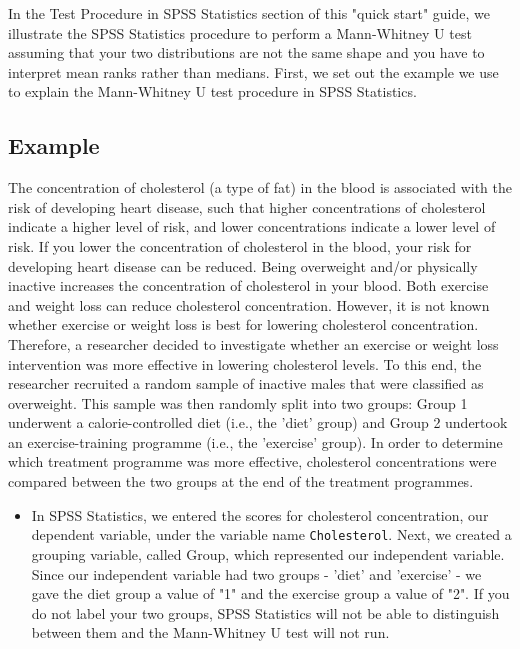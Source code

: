 \documentclass[]{article}
\begin{document}
In the Test Procedure in SPSS Statistics section of this "quick start" guide, we illustrate the SPSS Statistics procedure to perform a Mann-Whitney U test assuming that your two distributions are not the same shape and you have to interpret mean ranks rather than medians. First, we set out the example we use to explain the Mann-Whitney U test procedure in SPSS Statistics.

\subsection{Example}
The concentration of cholesterol (a type of fat) in the blood is associated with the risk of developing heart disease, such that higher concentrations of cholesterol indicate a higher level of risk, and lower concentrations indicate a lower level of risk. If you lower the concentration of cholesterol in the blood, your risk for developing heart disease can be reduced. Being overweight and/or physically inactive increases the concentration of cholesterol in your blood. Both exercise and weight loss can reduce cholesterol concentration. However, it is not known whether exercise or weight loss is best for lowering cholesterol concentration. Therefore, a researcher decided to investigate whether an exercise or weight loss intervention was more effective in lowering cholesterol levels. To this end, the researcher recruited a random sample of inactive males that were classified as overweight. This sample was then randomly split into two groups: Group 1 underwent a calorie-controlled diet (i.e., the 'diet' group) and Group 2 undertook an exercise-training programme (i.e., the 'exercise' group). In order to determine which treatment programme was more effective, cholesterol concentrations were compared between the two groups at the end of the treatment programmes.

\begin{itemize}
	\item In SPSS Statistics, we entered the scores for cholesterol concentration, our dependent variable, under the variable name \texttt{Cholesterol}. Next, we created a grouping variable, called Group, which represented our independent variable. Since our independent variable had two groups - 'diet' and 'exercise' - we gave the diet group a value of "1" and the exercise group a value of "2". If you do not label your two groups, SPSS Statistics will not be able to distinguish between them and the Mann-Whitney U test will not run.
\end{itemize}
\end{document}
